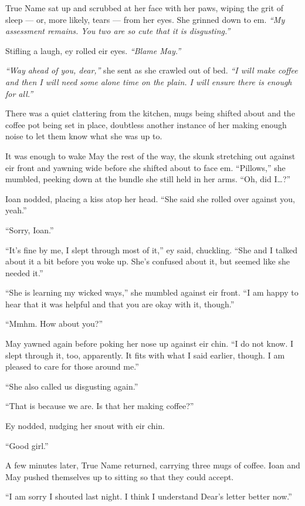 True Name sat up and scrubbed at her face with her paws, wiping the grit of sleep — or, more likely, tears — from her eyes. She grinned down to em. \emph{``My assessment remains. You two are so cute that it is disgusting.''}

Stifling a laugh, ey rolled eir eyes. \emph{``Blame May.''}

\emph{``Way ahead of you, dear,''} she sent as she crawled out of bed. \emph{``I will make coffee and then I will need some alone time on the plain. I will ensure there is enough for all.''}

There was a quiet clattering from the kitchen, mugs being shifted about and the coffee pot being set in place, doubtless another instance of her making enough noise to let them know what she was up to.

It was enough to wake May the rest of the way, the skunk stretching out against eir front and yawning wide before she shifted about to face em. ``Pillows,'' she mumbled, peeking down at the bundle she still held in her arms. ``Oh, did I\ldots?''

Ioan nodded, placing a kiss atop her head. ``She said she rolled over against you, yeah.''

``Sorry, Ioan.''

``It's fine by me, I slept through most of it,'' ey said, chuckling. ``She and I talked about it a bit before you woke up. She's confused about it, but seemed like she needed it.''

``She is learning my wicked ways,'' she mumbled against eir front. ``I am happy to hear that it was helpful and that you are okay with it, though.''

``Mmhm. How about you?''

May yawned again before poking her nose up against eir chin. ``I do not know. I slept through it, too, apparently. It fits with what I said earlier, though. I am pleased to care for those around me.''

``She also called us disgusting again.''

``That is because we are. Is that her making coffee?''

Ey nodded, nudging her snout with eir chin.

``Good girl.''

A few minutes later, True Name returned, carrying three mugs of coffee. Ioan and May pushed themselves up to sitting so that they could accept.

``I am sorry I shouted last night. I think I understand Dear's letter better now.''

